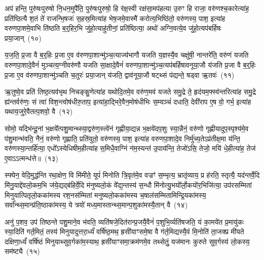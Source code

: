 अप॑ हन्ति॒ पुरु॑षःपुरुषो नि॒धन॒मुपै॑ति॒ पुरु॑षःपुरुषो॒ हि र॑क्ष॒स्वी रक्ष॑सा॒मप॑हत्या उ॒रुꣳ हि राजा॒ वरु॑णश्च॒कारेत्या॑ह॒ प्रति॑ष्ठित्यै श॒तं ते॑ राजन्भि॒षजः॑ स॒हस्र॒मित्या॑ह भेष॒जमे॒वास्मै॑ करोत्य॒भिष्ठि॑तो॒ वरु॑णस्य॒ पाश॒ इत्या॑ह वरुणपा॒शमे॒वाभि ति॑ष्ठति ब॒र्॒\mbox{}हिर॒भि जु॑हो॒त्याहु॑तीनां॒ प्रति॑ष्ठित्या॒ अथो॑ अग्नि॒वत्ये॒व जु॑हो॒त्यप॑बर्\mbox{}हिषः प्रया॒जान्~(१०)

य॒ज॒ति॒ प्र॒जा वै ब॒र्॒\mbox{}हिः प्र॒जा ए॒व व॑रुणपा॒शान्मु॑ञ्च॒त्याज्य॑भागौ यजति य॒ज्ञस्यै॒व चक्षु॑षी॒ नान्तरे॑ति॒ वरु॑णं यजति वरुणपा॒शादे॒वैनं॑ मुञ्चत्य॒ग्नीवरु॑णौ यजति सा॒क्षादे॒वैनं॑ वरुणपा॒शान्मु॑ञ्च॒त्यप॑बर्\mbox{}हिषावनूया॒जौ य॑जति प्र॒जा वै ब॒र्॒\mbox{}हिः प्र॒जा ए॒व व॑रुणपा॒शान्मु॑ञ्चति च॒तुरः॑ प्रया॒जान् य॑जति॒ द्वाव॑नूया॒जौ षट्थ्सं प॑द्यन्ते॒ षड्वा ऋ॒तवः॑~(११)

ऋ॒तुष्वे॒व प्रति॑ तिष्ठ॒त्यव॑भृथ निचङ्कु॒णेत्या॑ह यथोदि॒तमे॒व वरु॑ण॒मव॑ यजते समु॒द्रे ते॒ हृद॑यम॒फ्स्व॑न्तरित्या॑ह समु॒द्रे ह्य॑न्तर्वरु॑णः॒ सं त्वा॑ विश॒न्त्वोष॑धीरु॒ताप॒ इत्या॑हा॒द्भिरे॒वैन॒मोष॑धीभिः स॒म्यञ्चं॑ दधाति॒ देवी॑राप ए॒ष वो॒ गर्भ॒ इत्या॑ह यथाय॒जुरे॒वैतत्प॒शवो॒ वै~(१२)

सोमो॒ यद्भि॑न्दू॒नां भ॒क्षये᳚त्पशु॒मान्थ्स्या॒द्वरु॑ण॒स्त्वे॑नं गृह्णीया॒द्यन्न भ॒क्षये॑दप॒शुः स्या॒न्नैनं॒ वरु॑णो गृह्णीयादुप॒स्पृश्य॑मे॒व प॑शु॒मान्भ॑वति॒ नैनं॒ वरु॑णो गृह्णाति॒ प्रति॑युतो॒ वरु॑णस्य॒ पाश॒ इत्या॑ह वरुणपा॒शादे॒व निर्मु॑च्य॒ते\-ऽप्र॑तीक्ष॒मा य॑न्ति॒ वरु॑णस्या॒न्तर्\mbox{}हि॑त्या॒ एधो᳚\-ऽस्येधिषीम॒हीत्या॑ह स॒मिधै॒वाग्निं न॑म॒स्यन्त॑ उ॒पाय॑न्ति॒ तेजो॑\-ऽसि॒ तेजो॒ मयि॑ धे॒हीत्या॑ह॒ तेज॑ ए॒वा\-ऽऽ\-त्मन्ध॑त्ते॥~(१३)

{\anuvakamend[{रक्षाꣳ॑सि प्रया॒जानृ॒तवो॒ वै न॑म॒स्यन्तो॒ द्वाद॑श च}]}%

स्फ्येन॒ वेदि॒मुद्ध॑न्ति रथा॒क्षेण॒ वि मि॑मीते॒ यूपं॑ मिनोति त्रि॒वृत॑मे॒व वज्रꣳ॑ स॒म्भृत्य॒ भ्रातृ॑व्याय॒ प्र ह॑रति॒ स्तृत्यै॒ यद॑न्तर्वे॒दि मि॑नु॒याद्दे॑वलो॒कम॒भि ज॑ये॒द्यद्ब॑हिर्वे॒दि म॑नुष्यलो॒कं वे᳚द्य॒न्तस्य॑ स॒न्धौ मि॑नोत्यु॒भयो᳚र्लो॒कयो॑र॒भिजि॑त्या॒ उप॑रसम्मितां मिनुयात्पितृलो॒कका॑मस्य रश॒नस॑म्मितां मनुष्यलो॒कका॑मस्य च॒षाल॑सम्मितामिन्द्रि॒यका॑मस्य॒ सर्वा᳚न्थ्स॒मान्प्र॑ति॒ष्ठाका॑मस्य॒ ये त्रयो॑ मध्य॒मास्तान्थ्स॒मान्प॒शुका॑मस्यै॒तान् वै~(१४)

अनु॑ प॒शव॒ उप॑ तिष्ठन्ते पशु॒माने॒व भ॑वति॒ व्यति॑षजे॒दित॑रान्प्र॒जयै॒वैनं॑ प॒शुभि॒र्व्यति॑षजति॒ यं का॒मये॑त प्र॒मायु॑कः स्या॒दिति॑ गर्त॒मितं॒ तस्य॑ मिनुयादुत्तरा॒र्ध्यं॑ वर्\mbox{}षि॑ष्ठ॒मथ॒ ह्रसी॑याꣳसमे॒षा वै ग॑र्त॒मिद्यस्यै॒वं मि॒नोति॑ ता॒जक्प्र मी॑यते दक्षिणा॒र्ध्यं॑ वर्\mbox{}षि॑ष्ठं मिनुयाथ्सुव॒र्गका॑म॒स्याथ॒ ह्रसी॑याꣳसमा॒क्रम॑णमे॒व तथ्सेतुं॒ यज॑मानः कुरुते सुव॒र्गस्य॑ लो॒कस्य॒ सम॑ष्ट्यै~(१५)

